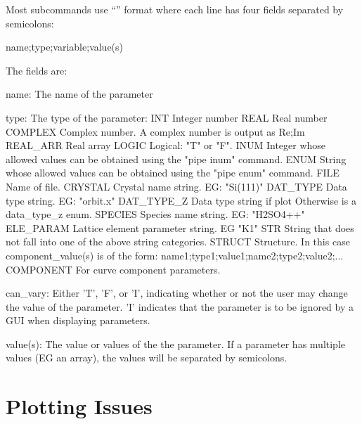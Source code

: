Most  subcommands use ``'' format where each line has four fields
separated by semicolons:
\begin{example}
  {name};{type};{variable};{value(s)}
\end{example}
The fields are:
\begin{example}
    name:       The name of the parameter

    type:       The type of the parameter:
        INT           Integer number
        REAL          Real number
        COMPLEX       Complex number. A complex number is output as Re;Im
        REAL_ARR      Real array
        LOGIC         Logical: "T" or "F".
        INUM          Integer whose allowed values can be obtained 
                        using the "pipe inum" command.
        ENUM          String whose allowed values can be obtained 
                        using the "pipe enum" command.
        FILE          Name of file.
        CRYSTAL       Crystal name string. EG: "Si(111)"
        DAT_TYPE      Data type string. EG: "orbit.x"
        DAT_TYPE_Z    Data type string if plot%
                        Otherwise is a data_type_z enum.
        SPECIES       Species name string. EG: "H2SO4++"
        ELE_PARAM     Lattice element parameter string. EG "K1"
        STR           String that does not fall into one of the above string categories.
        STRUCT        Structure. In this case {component_value(s)} is of the form:
                        {name1};{type1};{value1};{name2};{type2};{value2};...
        COMPONENT     For curve component parameters.

    can_vary:   Either 'T', 'F', or 'I', indicating whether or not the
                user may change the value of the parameter. 'I' indicates
                that the parameter is to be ignored by a GUI when displaying parameters.

    value(s):   The value or values of the the parameter. If a parameter has multiple
                values (EG an array), the values will be separated by semicolons.
\end{example}

\section{Plotting Issues}
\label{s:gui.plot}

